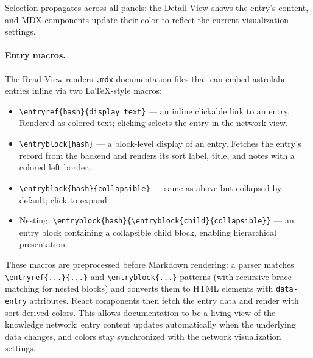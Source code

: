 Selection propagates across all panels: the Detail View shows the entry's content, and MDX components update their color to reflect the current visualization settings.

\paragraph{Entry macros.}
The Read View renders \texttt{.mdx} documentation files that can embed astrolabe entries inline via two \LaTeX-style macros:

\begin{itemize}
  \item \verb|\entryref{hash}{display text}| --- an inline clickable link to an entry. Rendered as colored text; clicking selects the entry in the network view.
  \item \verb|\entryblock{hash}| --- a block-level display of an entry. Fetches the entry's record from the backend and renders its sort label, title, and notes with a colored left border.
  \item \verb|\entryblock{hash}{collapsible}| --- same as above but collapsed by default; click to expand.
  \item Nesting: \verb|\entryblock{hash}{\entryblock{child}{collapsible}}| --- an entry block containing a collapsible child block, enabling hierarchical presentation.
\end{itemize}

These macros are preprocessed before Markdown rendering: a parser matches \verb|\entryref{...}{...}| and \verb|\entryblock{...}| patterns (with recursive brace matching for nested blocks) and converts them to HTML elements with \texttt{data-entry} attributes. React components then fetch the entry data and render with sort-derived colors. This allows documentation to be a living view of the knowledge network: entry content updates automatically when the underlying data changes, and colors stay synchronized with the network visualization settings.

